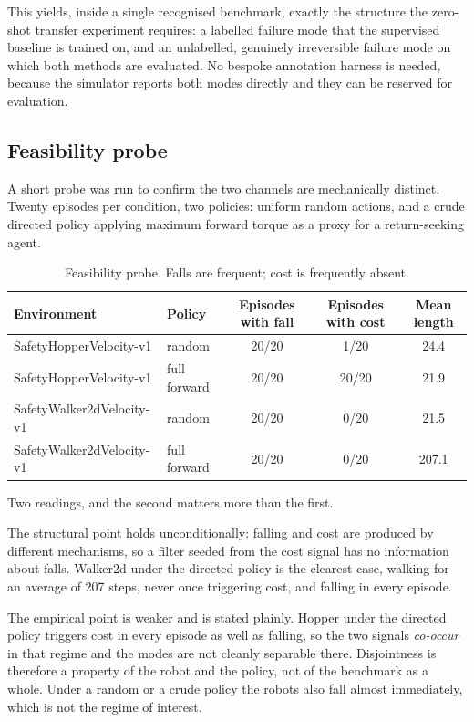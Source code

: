 \documentclass[11pt,a4paper]{article}
\begin{document}
This yields, inside a single recognised benchmark, exactly the structure the zero-shot
transfer experiment requires: a labelled failure mode that the supervised baseline is trained
on, and an unlabelled, genuinely irreversible failure mode on which both methods are
evaluated. No bespoke annotation harness is needed, because the simulator reports both modes
directly and they can be reserved for evaluation.

\subsection{Feasibility probe}

A short probe was run to confirm the two channels are mechanically distinct. Twenty episodes
per condition, two policies: uniform random actions, and a crude directed policy applying
maximum forward torque as a proxy for a return-seeking agent.

\begin{table}[h]
\centering
\begin{tabular}{llccc}
\toprule
Environment & Policy & Episodes with fall & Episodes with cost & Mean length \\
\midrule
SafetyHopperVelocity-v1   & random       & 20/20 & 1/20  & 24.4 \\
SafetyHopperVelocity-v1   & full forward & 20/20 & 20/20 & 21.9 \\
SafetyWalker2dVelocity-v1 & random       & 20/20 & 0/20  & 21.5 \\
SafetyWalker2dVelocity-v1 & full forward & 20/20 & 0/20  & 207.1 \\
\bottomrule
\end{tabular}
\caption{Feasibility probe. Falls are frequent; cost is frequently absent.}
\end{table}

Two readings, and the second matters more than the first.

The structural point holds unconditionally: falling and cost are produced by different
mechanisms, so a filter seeded from the cost signal has no information about falls. Walker2d
under the directed policy is the clearest case, walking for an average of 207 steps, never
once triggering cost, and falling in every episode.

The empirical point is weaker and is stated plainly. Hopper under the directed policy
triggers cost in every episode as well as falling, so the two signals \emph{co-occur} in that
regime and the modes are not cleanly separable there. Disjointness is therefore a property of
the robot and the policy, not of the benchmark as a whole. Under a random or a crude policy
the robots also fall almost immediately, which is not the regime of interest.
\end{document}
